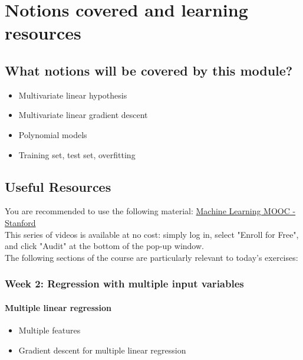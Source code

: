 

\chapter*{Notions covered and learning resources}

\section*{What notions will be covered by this module?}

\begin{itemize}
    \item Multivariate linear hypothesis
    \item Multivariate linear gradient descent
    \item Polynomial models
    \item Training set, test set, overfitting
\end{itemize}

\section*{Useful Resources}

You are recommended to use the following material: \href{https://www.coursera.org/learn/machine-learning}{Machine Learning MOOC - Stanford}\\
\newline
This series of videos is available at no cost: simply log in, select "Enroll for Free", and click "Audit" at the bottom of the pop-up window.\\
\newline
The following sections of the course are particularly relevant to today's exercises: 

\subsection*{Week 2: Regression with multiple input variables}

\subsubsection*{Multiple linear regression}
\begin{itemize}
  \item Multiple features
  \item Gradient descent for multiple linear regression
\end{itemize}

